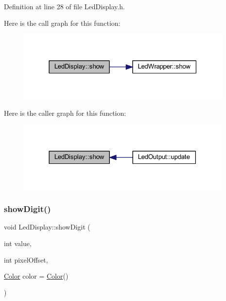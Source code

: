 Definition at line 28 of file Led\+Display.\+h.

Here is the call graph for this function\+:\nopagebreak
\begin{figure}[H]
\begin{center}
\leavevmode
\includegraphics[width=307pt]{class_led_display_a497d2686d902d16ae001173486dcb7ab_cgraph}
\end{center}
\end{figure}
Here is the caller graph for this function\+:\nopagebreak
\begin{figure}[H]
\begin{center}
\leavevmode
\includegraphics[width=306pt]{class_led_display_a497d2686d902d16ae001173486dcb7ab_icgraph}
\end{center}
\end{figure}
\mbox{\label{class_led_display_a4e8fd0added33e4ba163bff5bbc8cd69}} 
\subsubsection{\texorpdfstring{show\+Digit()}{showDigit()}}
{\footnotesize\ttfamily void Led\+Display\+::show\+Digit (\begin{DoxyParamCaption}\item[{int}]{value,  }\item[{int}]{pixel\+Offset,  }\item[{\hyperlink{struct_color}{Color}}]{color = {\ttfamily \hyperlink{struct_color}{Color}()} }\end{DoxyParamCaption})\hspace{0.3cm}{\ttfamily [inline]}}



